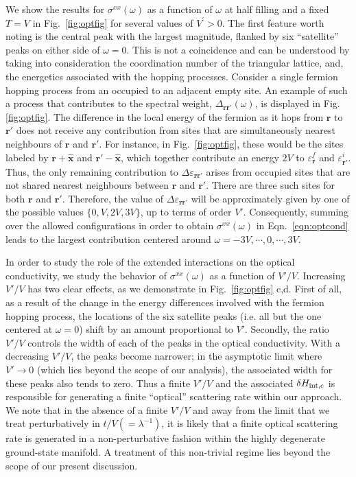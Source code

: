 \documentclass[aps,prx,onecolumn,amsmath,nofootinbib,amssymb,11pt]{revtex4-1}
\renewcommand{\vec}[1]{\boldsymbol{#1}}
\def \r {{\vec r}}
\def \Hc {H_{\textnormal{int,c}}}
\begin{document}
{We show the results for $\sigma^{xx}(\omega)$ as a function of $\omega$ at half filling and a fixed $T=V$ in Fig.~\ref{fig:optfig} for several values of $V^{\prime}>0$. The first feature worth noting is the central peak with the largest magnitude, flanked by six ``satellite'' peaks on either side of $\omega=0$. This is not a coincidence and can be understood by taking into consideration the coordination number of the triangular lattice, and, the energetics associated with the hopping processes. Consider a single fermion hopping process from an occupied to an adjacent empty site. An example of such a process that contributes to the spectral weight, $\Delta_{\r\r'}(\omega)$, is displayed in Fig. \ref{fig:optfig}. The difference in the local energy of the fermion as it hops from $\r$ to $\r'$ does not receive any contribution from sites that are simultaneously nearest neighbours of $\r$ and $\r'$. For instance, in Fig.~\ref{fig:optfig}, these would be the sites labeled by $\r + \hat{\bm{x}}$ and $\r' - \hat{\bm{x}}$, which together contribute an energy $2V$ to $\varepsilon_\r ^f$ and $\varepsilon_{\r'}^i$. Thus, the only remaining contribution to $\Delta \varepsilon_{ \r \r'}$ arises from occupied sites that are not shared nearest neighbours between $\r$ and $\r'$. There are three such sites for both $\r$ and $\r'$. Therefore, the value of $\Delta \varepsilon_{\r \r'}$  will be approximately given by one of the possible values $\{0,V,2V,3V\}$, up to terms of order $V'$. Consequently, summing over the allowed configurations in order to obtain $\sigma ^{xx} (\omega)$ in Eqn.~\ref{eqn:optcond} leads to the largest contribution centered around  $\omega=-3V,\cdots,0 ,\cdots, 3V$. 


In order to study the role of the extended interactions on the optical conductivity, we study the behavior of $\sigma^{xx}(\omega)$ as a function of $V'/V$. Increasing $V'/V$ has two clear effects, as we demonstrate in Fig.~\ref{fig:optfig} c,d. First of all, as a result of the change in the energy differences involved with the fermion hopping process, the locations of the six satellite peaks (i.e. all but the one centered at $\omega=0$) shift by an amount proportional to $V'$.  Secondly, the ratio  $V'/V$  controls the width of each of the peaks in the optical conductivity. With a decreasing $V'/V$, the peaks become narrower; in the asymptotic limit where $V'\rightarrow0$ (which lies beyond the scope of our analysis), the associated width for these peaks also tends to zero. Thus a finite $V'/V$ and the associated $\delta\Hc$ is responsible for generating a finite ``optical'' scattering rate within our approach. We note that in the absence of a finite $V'/V$ and away from the limit that we treat perturbatively in $t/V (=\lambda^{-1})$, it is likely that a finite optical scattering rate is generated in a non-perturbative fashion within the highly degenerate ground-state manifold. A treatment of this non-trivial regime lies beyond the scope of our present discussion. 

}
\end{document}
